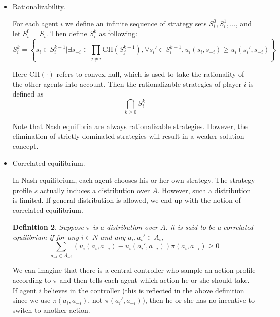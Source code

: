\documentclass{article}
\newtheorem{definition}{Definition}
\begin{document}
\begin{itemize}
\begin{definition}
A strategy is strictly (weakly) dominated for player $i$ if it is strictly (weakly) dominated by another strategy of player $i$.
\end{definition}

We can remove pure strictly dominated strategies from the game as long as there exists one. This will result in a weaker solution concept than Nash equilibrium. What's more, the result is independent of the elimination order (Church-Rosser property).

\item Rationalizability.

For each agent $i$ we define an infinite sequence of strategy sets $S_i^0,S_i^1,\ldots$, and let $S_i^0=S_i$. Then define $S_i^k$ as following:
$$S_i^k=\left\{s_i\in S_i^{k-1}\bigg|\exists s_{-i}\in\prod_{j\ne i}\mathrm{CH}(S_j^{k-1}),\forall s_i'\in S_i^{k-1},u_i(s_i,s_{-i})\ge u_i(s_i',s_{-i})\right\}$$

Here $\mathrm{CH}(\cdot)$ refers to convex hull, which is used to take the rationality of the other agents into account. Then the rationalizable strategies of player $i$ is defined as 
$$\bigcap_{k\ge0}S_i^k$$

Note that Nash equilibria are always rationalizable strategies. However, the elimination of strictly dominated strategies will result in a weaker solution concept.

\item Correlated equilibrium.

In Nash equilibrium, each agent chooses his or her own strategy. The strategy profile $s$ actually induces a distribution over $A$. However, such a distribution is limited. If general distribution is allowed, we end up with the notion of correlated equilibrium.

\begin{definition}
Suppose $\pi$ is a distribution over $A$. it is said to be a correlated equilibrium if for any $i\in N$ and any $a_i,a_i'\in A_i$, 
$$\sum_{a_{-i}\in A_{-i}}(u_i(a_i,a_{-i})-u_i(a_i',a_{-i}))\pi(a_i,a_{-i})\ge0$$
\end{definition}

We can imagine that there is a central controller who sample an action profile according to $\pi$ and then tells each agent which action he or she should take. If agent $i$ believes in the controller (this is reflected in the above definition since we use $\pi(a_i,a_{-i})$, not $\pi(a_i',a_{-i})$), then he or she has no incentive to switch to another action.


\end{itemize}
\end{document}
